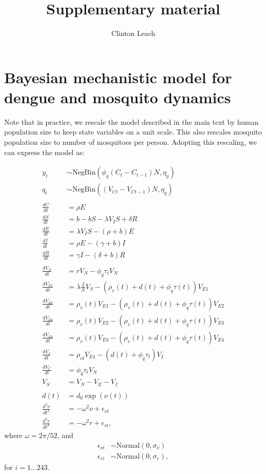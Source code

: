 \documentclass[12pt,letterpaper]{article}
\title{Supplementary material}
\author{Clinton Leach}
\begin{document}
\maketitle


\section*{Bayesian mechanistic model for dengue and mosquito dynamics}

Note that in practice, we rescale the model described in the main text by human population size to keep state variables on a unit scale.
This also rescales mosquito population size to number of mosquitoes per person.
Adopting this rescaling, we can express the model as:

\begin{align}
y_t & \sim \text{NegBin}(\phi_y  (C_t - C_{t-1})N, \eta_y)\\
q_t & \sim \text{NegBin}((V_{Ct} - V_{Ct-1})N, \eta_q)\\
\\
\frac{dC}{dt} &= \rho E \\
\frac{dS}{dt} &= b - bS - \lambda V_{I}S + \delta R\\
\frac{dE}{dt} &= \lambda V_{I}S - (\rho + b)E\\
\frac{dI}{dt} &= \rho E - (\gamma + b)I\\
\frac{dR}{dt} &= \gamma I - (\delta + b)R\\
\\
\frac{dV_N}{dt} & = r V_N - \phi_q \tau_t V_N\\
\frac{dV_{E1}}{dt} &= \lambda \frac{I}{N} V_S - (\rho_{v}(t) + d(t) + \phi_q \tau(t))V_{E1}\\
\frac{dV_{E2}}{dt} &= \rho_{v}(t) V_{E1} - (\rho_{v}(t) + d(t) + \phi_q \tau(t))V_{E2}\\
\frac{dV_{E3}}{dt} &= \rho_{v}(t) V_{E2}  - (\rho_{v}(t) + d(t) + \phi_q \tau(t))V_{E3}\\
\frac{dV_{E4}}{dt} &= \rho_{v}(t) V_{E3}  - (\rho_{v}(t) + d(t) + \phi_q \tau(t))V_{E4}\\\frac{dV_I}{dt} &= \rho_{vt} V_{E4} - (d(t) + \phi_q \tau_t) V_I\\
\frac{dV_C}{dt} & = \phi_q \tau_t V_N\\
V_S &= V_N - V_E - V_I\\
\\
d(t) &= d_0 \exp(\nu(t))\\
\frac{d^2\nu}{dt^2} &= -\omega^2 \nu + \epsilon_{\nu t}\\
\frac{d^2 r}{dt^2} &= -\omega^2 r + \epsilon_{rt},
\end{align}
where $\omega = 2\pi / 52$, and
\begin{align}
\epsilon_{\nu i} & \sim \text{Normal}(0, \sigma_{\nu})\\
\epsilon_{ri} & \sim \text{Normal}(0, \sigma_r),
\end{align}
for $i = 1 \dots 243$.
\end{document}
